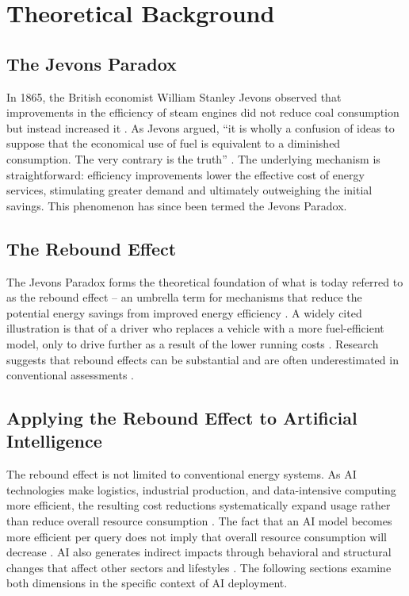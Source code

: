 \section{Theoretical Background}
\label{sec:theory}

\subsection{The Jevons Paradox}

In 1865, the British economist William Stanley Jevons observed
that improvements in the efficiency of steam engines did not
reduce coal consumption but instead increased it \cite{sorrell2009}.
As Jevons argued, ``it is wholly a confusion of ideas to suppose
that the economical use of fuel is equivalent to a diminished
consumption. The very contrary is the truth'' \cite{sorrell2009}. The underlying
mechanism is straightforward: efficiency improvements lower the
effective cost of energy services, stimulating greater demand
and ultimately outweighing the initial savings. This phenomenon
has since been termed the Jevons Paradox.

\subsection{The Rebound Effect}

The Jevons Paradox forms the theoretical foundation of what is
today referred to as the rebound effect -- an umbrella term for
mechanisms that reduce the potential energy savings from improved
energy efficiency \cite{sorrell2009}. A widely cited illustration
is that of a driver who replaces a vehicle with a more
fuel-efficient model, only to drive further as a result of the
lower running costs \cite{sorrell2009}. Research suggests that
rebound effects can be substantial and are often underestimated
in conventional assessments \cite{sorrell2009}.

\subsection{Applying the Rebound Effect to Artificial Intelligence}

The rebound effect is not limited to conventional energy systems.
As AI technologies make logistics, industrial production, and
data-intensive computing more efficient, the resulting cost
reductions systematically expand usage rather than reduce overall
resource consumption \cite{mhlanga2025}. The fact that an AI
model becomes more efficient per query does not imply that
overall resource consumption will decrease \cite{luccioni2025}.
AI also generates indirect impacts through behavioral and
structural changes that affect other sectors and lifestyles
\cite{luccioni2025}. The following sections examine both
dimensions in the specific context of AI deployment.
